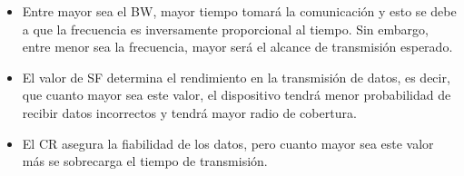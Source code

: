 \begin{itemize}
	\item Entre mayor sea el BW, mayor tiempo tomará la comunicación y esto se debe a que la frecuencia es inversamente proporcional al tiempo. Sin embargo, entre menor sea la frecuencia, mayor será el alcance de transmisión esperado.
	 \item El valor de SF determina el rendimiento en la transmisión de datos, es decir, que cuanto mayor sea este valor, el dispositivo tendrá menor probabilidad de recibir datos incorrectos y tendrá mayor radio de cobertura.
	 \item El CR asegura la fiabilidad de los datos, pero cuanto mayor sea este valor más se sobrecarga el tiempo de transmisión.
\end{itemize}                                

